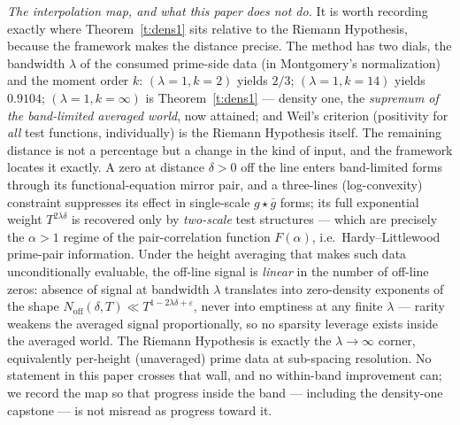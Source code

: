 \documentclass[11pt]{article}
\numberwithin{equation}{section}
\theoremstyle{definition}
\theoremstyle{remark}
\begin{document}
\medskip
\noindent\emph{The interpolation map, and what this paper
does not do.} It is worth recording exactly where
Theorem~\ref{t:dens1} sits relative to the Riemann
Hypothesis, because the framework makes the distance
precise. The method has two dials, the bandwidth $\lambda$
of the consumed prime-side data (in Montgomery's
normalization) and the moment order $k$:
$(\lambda{=}1,k{=}2)$ yields $2/3$;
$(\lambda{=}1,k{=}14)$ yields $0.9104$;
$(\lambda{=}1,k{=}\infty)$ is Theorem~\ref{t:dens1} ---
density one, the \emph{supremum of the band-limited averaged
world}, now attained; and Weil's criterion (positivity for
\emph{all} test functions, individually) is the Riemann
Hypothesis itself. The remaining distance is not a
percentage but a change in the kind of input, and the
framework locates it exactly. A zero at distance
$\delta>0$ off the line enters band-limited forms through
its functional-equation mirror pair, and a three-lines
(log-convexity) constraint suppresses its effect in
single-scale $g\star\bar g$ forms; its full exponential
weight $T^{2\lambda\delta}$ is recovered only by
\emph{two-scale} test structures --- which are precisely the
$\alpha>1$ regime of the pair-correlation function $F(\alpha)$,
i.e.\ Hardy--Littlewood prime-pair information. Under the
height averaging that makes such data unconditionally
evaluable, the off-line signal is \emph{linear} in the
number of off-line zeros: absence of signal at bandwidth
$\lambda$ translates into zero-density exponents of the
shape $N_{\mathrm{off}}(\delta,T)\ll
T^{1-2\lambda\delta+\varepsilon}$, never into emptiness at
any finite $\lambda$ --- rarity weakens the averaged signal
proportionally, so no sparsity leverage exists inside the
averaged world. The Riemann Hypothesis is exactly the
$\lambda\to\infty$ corner, equivalently per-height
(unaveraged) prime data at sub-spacing resolution. No
statement in this paper crosses that wall, and no
within-band improvement can; we record the map so that
progress inside the band --- including the density-one
capstone --- is not misread as progress toward it.
\end{document}

